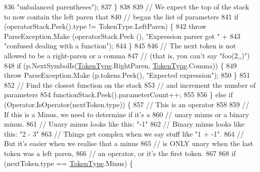 \begin{DoxyCode}
836                                 \textcolor{stringliteral}{"unbalanced parentheses"});
837                         \}
838 
839                         \textcolor{comment}{// We expect the top of the stack to now contain the left paren that}
840                         \textcolor{comment}{// began the list of parameters}
841                         \textcolor{keywordflow}{if} (operatorStack.Peek().type != TokenType.LeftParen) \{
842                             \textcolor{keywordflow}{throw} ParseException.Make (operatorStack.Peek (), \textcolor{stringliteral}{"Expression parser got "} +
843                                 \textcolor{stringliteral}{"confused dealing with a function"});
844                         \}
845 
846                         \textcolor{comment}{// The next token is not allowed to be a right-paren or a comma}
847                         \textcolor{comment}{// (that is, you can't say "foo(2,,)")}
848                         \textcolor{keywordflow}{if} (p.NextSymbolIs(\hyperlink{a00045_a301aa7c866593a5b625a8fc158bbeace}{TokenType}.RightParen, 
      \hyperlink{a00045_a301aa7c866593a5b625a8fc158bbeace}{TokenType}.Comma)) \{
849                             \textcolor{keywordflow}{throw} ParseException.Make (p.tokens.Peek(), \textcolor{stringliteral}{"Expected expression"});
850                         \}
851 
852                         \textcolor{comment}{// Find the closest function on the stack}
853                         \textcolor{comment}{// and increment the number of parameters}
854                         functionStack.Peek().parameterCount++;
855 
856                     \} \textcolor{keywordflow}{else} \textcolor{keywordflow}{if} (Operator.IsOperator(nextToken.type)) \{
857                         \textcolor{comment}{// This is an operator}
858 
859                         \textcolor{comment}{// If this is a Minus, we need to determine if it's a}
860                         \textcolor{comment}{// unary minus or a binary minus.}
861                         \textcolor{comment}{// Unary minus looks like this: "-1"}
862                         \textcolor{comment}{// Binary minus looks like this: "2 - 3"}
863                         \textcolor{comment}{// Things get complex when we say stuff like "1 + -1".}
864                         \textcolor{comment}{// But it's easier when we realise that a minus}
865                         \textcolor{comment}{// is ONLY unary when the last token was a left paren,}
866                         \textcolor{comment}{// an operator, or it's the first token.}
867 
868                         \textcolor{keywordflow}{if} (nextToken.type == \hyperlink{a00045_a301aa7c866593a5b625a8fc158bbeace}{TokenType}.Minus) \{

\end{DoxyCode}
